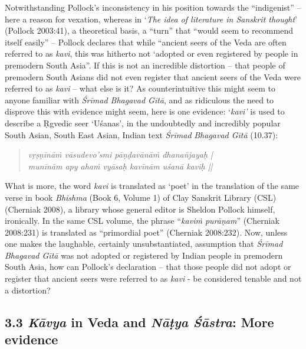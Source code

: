 Notwithstanding Pollock’s inconsistency in his position towards the “indigenist” – here a reason for vexation, whereas in ‘\textit{The idea of literature in Sanskrit thought}’ (Pollock 2003:41), a theoretical basis, a “turn” that “would seem to recommend itself easily” – Pollock declares that while “ancient seers of the Veda are often referred to as \textit{kavi}, this was hitherto not ‘adopted or even registered by people in premodern South Asia”. If this is not an incredible distortion – that people of premodern South Asians did not even register that ancient seers of the Veda were referred to as \textit{kavi} – what else is it? As counterintuitive this might seem to anyone familiar with \textit{Śrīmad Bhagavad Gītā}, and as ridiculous the need to disprove this with evidence might seem, here is one evidence: ‘\textit{kavi’} is used to describe a Ṛgvedic seer ‘Uśanas’, in the undoubtedly and incredibly popular South Asian, South East Asian, Indian text \textit{Śrīmad} \textit{Bhagavad Gītā} (10.37):

\begin{verse}
\textit{vṛṣṇīnāṁ vāsudevo’smi pāṇḍavānāṁ dhanañjayaḥ |}\\\textit{munīnām apy ahaṁ vyāsaḥ kavīnām uśanā kaviḥ ||}
\end{verse}

What is more, the word \textit{kavi} is translated as ‘poet’ in the translation of the same verse in book \textit{Bhishma} (Book 6, Volume 1) of Clay Sanskrit Library (CSL) (Cherniak 2008), a library whose general editor is Sheldon Pollock himself, ironically. In the same CSL volume, the phrase “\textit{kaviṁ purāṇam}” (Cherniak 2008:231) is translated as “primordial poet” (Cherniak 2008:232). Now, unless one makes the laughable, certainly unsubstantiated, assumption that \textit{Śrīmad} \textit{Bhagavad Gītā} was not adopted or registered by Indian people in premodern South Asia, how can Pollock’s declaration – that those people did not adopt or register that ancient seers were referred to as \textit{kavi} - be considered tenable and not a distortion?


\subsection*{3.3 \textit{Kāvya} in Veda and \textit{Nāṭya Śāstra}: More evidence}

